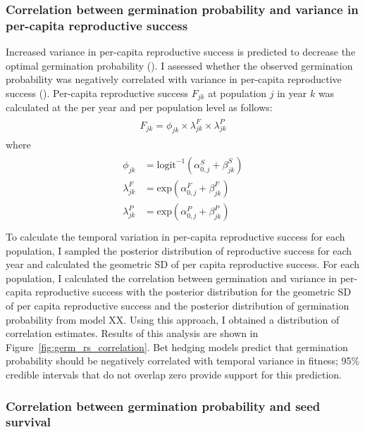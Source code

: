 \documentclass[12pt, oneside, titlepage]{article}   	%
\begin{document}
\subsubsection*{Correlation between germination probability and variance in per-capita reproductive success}

Increased variance in per-capita reproductive success is predicted to decrease the optimal germination probability (\cite{cohen1966,ellner1985a}). I assessed whether the observed germination probability was negatively correlated with variance in per-capita reproductive success (\cite{venable2007}). Per-capita reproductive success $F_{jk}$ at population $j$ in year $k$ was calculated at the per year and per population level as follows:
%
\begin{align}
  \begin{split}
F_{jk} = \phi_{jk} \times \lambda^F_{jk} \times \lambda^P_{jk} \label{eq:percapitars}
  \end{split}
\end{align}
%
where
%
\begin{align}
  \begin{split}
\phi_{jk} & = \mathrm{logit}^{-1}(\alpha^S_{0,j} + \beta^S_{jk}) \\
\lambda^F_{jk} & = \mathrm{exp}(\alpha^F_{0,j} + \beta^F_{jk}) \\
\lambda^P_{jk} & = \mathrm{exp}(\alpha^P_{0,j} + \beta^P_{jk}) \\
  \end{split}
\end{align}
%
To calculate the temporal variation in per-capita reproductive success for each population, I sampled the posterior distribution of reproductive success for each year and calculated the geometric SD of per capita reproductive success. For each population, I calculated the correlation between germination and variance in per-capita reproductive success with the posterior distribution for the geometric SD of per capita reproductive success and the posterior distribution of germination probability from model XX. Using this approach, I obtained a distribution of correlation estimates. Results of this analysis are shown in Figure~\ref{fig:germ_rs_correlation}. Bet hedging models predict that germination probability should be negatively correlated with temporal variance in fitness; 95\% credible intervals that do not overlap zero provide support for this prediction.

\subsubsection*{Correlation between germination probability and seed survival}
\end{document}
